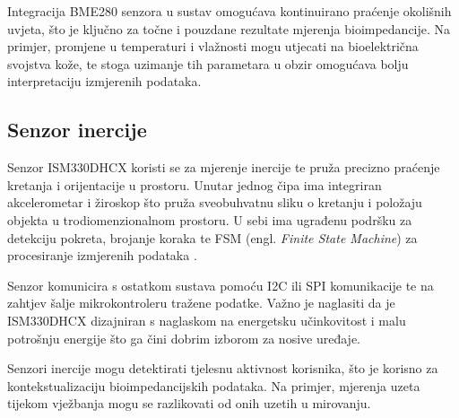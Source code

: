 \documentclass[../diplomski_rad.tex]{subfiles}
\begin{document}
Integracija BME280 senzora u sustav omogućava kontinuirano praćenje okolišnih uvjeta, 
što je ključno za točne i pouzdane rezultate mjerenja bioimpedancije. 
Na primjer, promjene u temperaturi i vlažnosti mogu utjecati na bioelektrična svojstva kože, 
te stoga uzimanje tih parametara u obzir omogućava bolju interpretaciju izmjerenih podataka.

\subsection{Senzor inercije}

Senzor ISM330DHCX koristi se za mjerenje inercije te pruža precizno praćenje kretanja i orijentacije u prostoru.
Unutar jednog čipa ima integriran akcelerometar i žiroskop što pruža sveobuhvatnu sliku o kretanju 
i položaju objekta u trodiomenzionalnom prostoru. U sebi ima ugrađenu podršku za detekciju pokreta, brojanje koraka te 
FSM (engl. \textit{Finite State Machine}) za procesiranje izmjerenih podataka \cite{ism330dhcx}. 

Senzor komunicira s ostatkom sustava pomoću I2C ili SPI komunikacije te na zahtjev šalje mikrokontroleru tražene podatke.
Važno je naglasiti da je ISM330DHCX dizajniran s naglaskom na energetsku učinkovitost i malu potrošnju energije 
što ga čini dobrim izborom za nosive uređaje.

Senzori inercije mogu detektirati tjelesnu aktivnost korisnika, što je korisno za kontekstualizaciju bioimpedancijskih podataka. 
Na primjer, mjerenja uzeta tijekom vježbanja mogu se razlikovati od onih uzetih u mirovanju.
\end{document}
